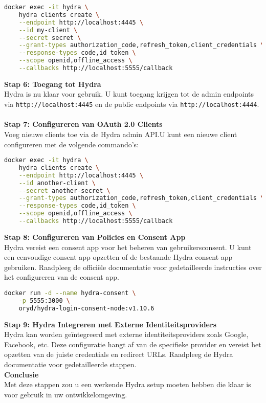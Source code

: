 \begin{lstlisting}[language=bash]
docker exec -it hydra \
    hydra clients create \
    --endpoint http://localhost:4445 \
    --id my-client \
    --secret secret \
    --grant-types authorization_code,refresh_token,client_credentials \
    --response-types code,id_token \
    --scope openid,offline_access \
    --callbacks http://localhost:5555/callback
\end{lstlisting}
\textbf{Stap 6: Toegang tot Hydra}\\
Hydra is nu klaar voor gebruik. U kunt toegang krijgen tot de admin endpoints via \texttt{http://localhost:4445} en de public endpoints via \texttt{http://localhost:4444}.\\\\
\textbf{Stap 7: Configureren van OAuth 2.0 Clients}\\
Voeg nieuwe clients toe via de Hydra admin API.\@ U kunt een nieuwe client configureren met de volgende commando's:
\begin{lstlisting}[language=bash]
docker exec -it hydra \
    hydra clients create \
    --endpoint http://localhost:4445 \
    --id another-client \
    --secret another-secret \
    --grant-types authorization_code,refresh_token,client_credentials \
    --response-types code,id_token \
    --scope openid,offline_access \
    --callbacks http://localhost:5555/callback
\end{lstlisting}
\textbf{Stap 8: Configureren van Policies en Consent App}\\
Hydra vereist een consent app voor het beheren van gebruikersconsent. U kunt een eenvoudige consent app opzetten of de bestaande Hydra consent app gebruiken. Raadpleeg de officiële documentatie voor gedetailleerde instructies over het configureren van de consent app.
\begin{lstlisting}[language=bash]
docker run -d --name hydra-consent \
    -p 5555:3000 \
    oryd/hydra-login-consent-node:v1.10.6
\end{lstlisting}
\textbf{Stap 9: Hydra Integreren met Externe Identiteitsproviders}\\
Hydra kan worden geïntegreerd met externe identiteitsproviders zoals Google, Facebook, etc. Deze configuratie hangt af van de specifieke provider en vereist het opzetten van de juiste credentials en redirect URLs. Raadpleeg de Hydra documentatie voor gedetailleerde stappen.\\
\textbf{Conclusie}\\
Met deze stappen zou u een werkende Hydra setup moeten hebben die klaar is voor gebruik in uw ontwikkelomgeving.


